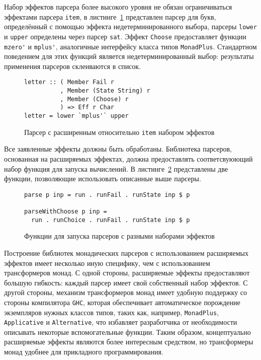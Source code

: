 Набор эффектов парсера более высокого уровня не обязан ограничиваться эффектами парсера \lstinline{item}, в листинге~\ref{listing:ExtEffectsMpus} представлен парсер для букв, определённый с помощью эффекта недетерминированного выбора, парсеры \lstinline{lower} и \lstinline{upper} определены через парсер \lstinline{sat}. Эффект \lstinline{Choose} предоставляет функции \lstinline{mzero'} и \lstinline{mplus'}, аналогичные интерфейсу класса типов \lstinline{MonadPlus}. Стандартном поведением для этих функций является недетерминированный выбор: результаты применения парсеров склеиваются в список.  

\begin{figure}[t]
\begin{lstlisting}
letter :: ( Member Fail r
          , Member (State String) r
          , Member (Choose) r
          ) => Eff r Char
letter = lower `mplus'` upper
\end{lstlisting}
\caption{Парсер с расширенным относительно \lstinline{item} набором эффектов}
\label{listing:ExtEffectsMpus}
\end{figure}

Все заявленные эффекты должны быть обработаны. Библиотека парсеров, основанная на расширяемых эффектах, должна предоставлять соответсвуюющий набор функция для запуска вычислений. В листинге~\ref{listing:ExtEffectsRunners} представлены две функции, позволяющие использовать описанные выше парсеры.

\begin{figure}[t]
\begin{lstlisting}
parse p inp = run . runFail . runState inp $ p

parseWithChoose p inp = 
  run . runChoice . runFail . runState inp $ p 
\end{lstlisting}
\caption{Функции для запуска парсеров с разными наборами эффектов}
\label{listing:ExtEffectsRunners}
\end{figure}

Построение библиотек монадических парсеров с использованием расширяемых эффектов имеет несколько иную специфику, чем с использованием трансформеров монад. С одной стороны, расширяемые эффекты предоставляют большую гибкость: каждый парсер имеет свой собственный набор эффектов. С другой стороны, механизм трансформеров монад имеет удобную поддержку со стороны компилятора \lstinline{GHC}, которая обеспечивает автоматическое порождение экземпляров нужных классов типов, таких как, например, \lstinline{MonadPlus}, \lstinline{Applicative} и \lstinline{Alternative}, что избавляет разработчика от необходимости описывать некоторые вспомогательные функции. Таким образом, концептуально расширяемые эффекты являются более интересным средством, но трансформеры монад удобнее для прикладного программирования.    


